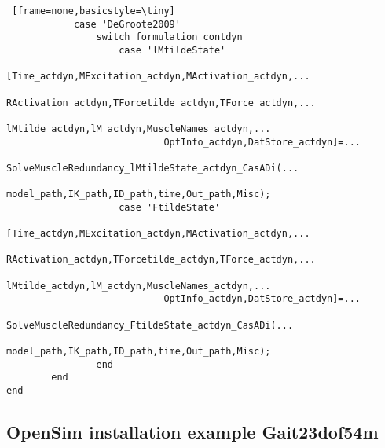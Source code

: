 \documentclass[a4paper,oneside,11pt]{article}
\begin{document}
\begin{lstlisting} [frame=none,basicstyle=\tiny]
            case 'DeGroote2009'
                switch formulation_contdyn
                    case 'lMtildeState'
                        [Time_actdyn,MExcitation_actdyn,MActivation_actdyn,...
                            RActivation_actdyn,TForcetilde_actdyn,TForce_actdyn,...
                            lMtilde_actdyn,lM_actdyn,MuscleNames_actdyn,...
                            OptInfo_actdyn,DatStore_actdyn]=...
                            SolveMuscleRedundancy_lMtildeState_actdyn_CasADi(...
                            model_path,IK_path,ID_path,time,Out_path,Misc);
                    case 'FtildeState'   
                        [Time_actdyn,MExcitation_actdyn,MActivation_actdyn,...
                            RActivation_actdyn,TForcetilde_actdyn,TForce_actdyn,...
                            lMtilde_actdyn,lM_actdyn,MuscleNames_actdyn,...
                            OptInfo_actdyn,DatStore_actdyn]=...
                            SolveMuscleRedundancy_FtildeState_actdyn_CasADi(...
                            model_path,IK_path,ID_path,time,Out_path,Misc);
                end
        end
end

\end{lstlisting}


\subsection{OpenSim installation example Gait23dof54m}
\end{document}
